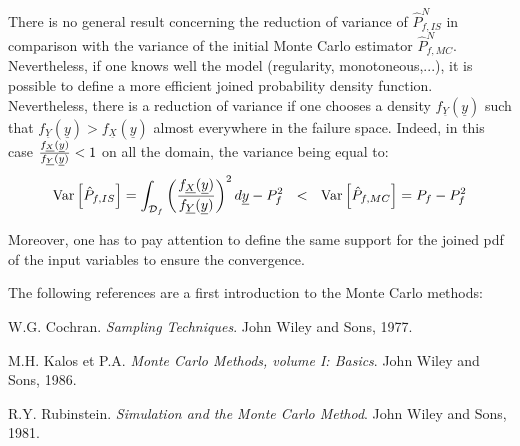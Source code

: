             {
              There is no general result concerning the reduction of variance of $\hat{P}_{f,IS}^N$ in comparison with the variance of the initial Monte Carlo estimator $\hat{P}_{f,MC}^N$. Nevertheless, if one knows well the model (regularity, monotoneous,...), it is possible to define a more efficient joined probability density function.
              Nevertheless, there is a reduction of variance if one chooses a density $f_{\underline{Y}}(\underline{y})$ such that $f_{\underline{Y}}(\underline{y})> f_{\underline{X}}(\underline{y})$ almost everywhere in the failure space. Indeed, in this case $\frac{f_{\underline{X}}(\underline{y})}{f_{\underline{Y}}(\underline{y})} < 1$ on all the domain, the variance being equal to:
              \begin{align*}
                {\rm Var}\left[ \hat{P}_{f,IS} \right] = \int_{{\mathcal D}_f} \left( \frac{f_{\underline{X}}(\underline{y})}{f_{\underline{Y}}(\underline{y})} \right)^2 d\underline{y} - P_f^2 \ \ < \ \ {\rm Var}\left[ \hat{P}_{f,MC} \right] = P_f-P_f^2
              \end{align*}

              Moreover, one has to pay attention to define the same support for the joined pdf of the input variables to ensure the convergence.


              The following references are a first introduction to the Monte Carlo methods:

              W.G. Cochran. \textit{Sampling Techniques}. John Wiley and Sons, 1977.

              M.H. Kalos et P.A. \textit{Monte Carlo Methods, volume I: Basics}. John Wiley and Sons, 1986.

              R.Y. Rubinstein. \textit{Simulation and the Monte Carlo Method}. John Wiley and Sons, 1981.



            }
